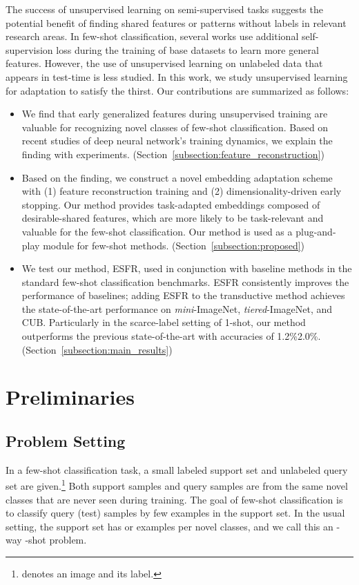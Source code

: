 \documentclass{article}
\begin{document}
The success of unsupervised learning on semi-supervised tasks suggests the potential benefit of finding shared features or patterns without labels in relevant research areas. In few-shot classification, several works \cite{Gidaris_2019_ICCV, self_eccv} use additional self-supervision loss during the training of base datasets to learn more general features. However, the use of unsupervised learning on unlabeled data that appears in test-time is less studied. In this work, we study unsupervised learning for adaptation to satisfy the thirst.
\newpage
Our contributions are summarized as follows:
\begin{itemize}
	\item We find that early generalized features during unsupervised training are valuable for recognizing novel classes of few-shot classification. Based on recent studies of deep neural network's training dynamics, we explain the finding with experiments.
	(Section~\ref{subsection:feature_reconstruction})
	
	\item Based on the finding, we construct a novel embedding adaptation scheme with (1) feature reconstruction training and (2) dimensionality-driven early stopping. Our method provides task-adapted embeddings composed of desirable-shared features, which are more likely to be task-relevant and valuable for the few-shot classification. Our method is used as a plug-and-play module for few-shot methods.
	(Section~\ref{subsection:proposed})
	
	\item We test our method, ESFR, used in conjunction with baseline methods in the standard few-shot classification benchmarks. ESFR consistently improves the performance of baselines; adding ESFR to the transductive method achieves the state-of-the-art performance on \textit{mini}-ImageNet, \textit{tiered}-ImageNet, and CUB.
	Particularly in the scarce-label setting of 1-shot, our method outperforms the previous state-of-the-art with accuracies of 1.2\%2.0\%. (Section~\ref{subsection:main_results})
\end{itemize} \section{Preliminaries}
\subsection{Problem Setting}
In a few-shot classification task, a small labeled support set  and unlabeled query set  are given.\footnote{ denotes an image and its label.}
Both support samples and query samples are from the same novel classes that are never seen during training.
The goal of few-shot classification is to classify query (test) samples by few examples in the support set.
In the usual setting, the support set has  or  examples per  novel classes, and we call this an -way -shot problem.
\end{document}
